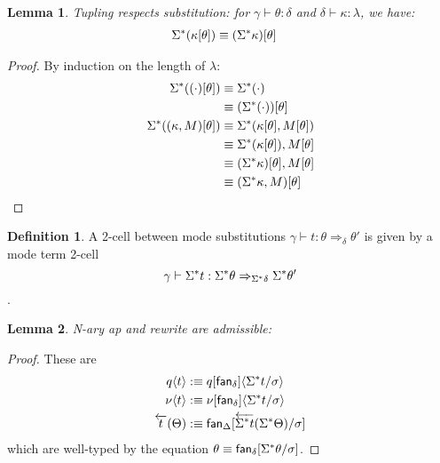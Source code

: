 \documentclass[10pt]{article}
\newtheorem{lemma}{Lemma}
\theoremstyle{definition}
\newtheorem{definition}{Definition}
\newcommand{\yields}{\vdash}
\newcommand{\tcell}{\Rightarrow}
\newcommand{\type}{\,\,\mathsf{mode}}
\newcommand\fan[1]{\ensuremath{\mathsf{fan}_{#1}}}
\newcommand{\rewrite}[2]{\overleftarrow{#1}(#2)}
\newcommand\TypeTwo[4]{\ensuremath{#1 \vdash #2 :  #3 \tcell #4}}
\newcommand\TermTwoT[5]{\ensuremath{#1 \vdash {#2} : #3 \tcell_{#5} #4}}
\newcommand\TrPlus[2]{\ensuremath{{#1}^+(#2)}}
\newcommand\ap[2]{\ensuremath{#1 \langle #2 \rangle }}
\begin{document}
\begin{lemma}
Tupling respects substitution: for $\gamma \yields \theta : \delta$ and $\delta \yields \kappa : \lambda$, we have:
\begin{align*}
\Sigma^*{(\kappa[\theta])} &\equiv (\Sigma^*{\kappa})[\theta]
\end{align*}
\end{lemma}
\begin{proof}
By induction on the length of $\lambda$:
\begin{align*}
\Sigma^*{((\cdot)[\theta])}
&\equiv \Sigma^*{(\cdot)} \\
&\equiv (\Sigma^*{(\cdot)})[\theta] \\
\Sigma^*{((\kappa, M)[\theta])}
&\equiv \Sigma^*{(\kappa[\theta], M[\theta])} \\
&\equiv \Sigma^*{(\kappa[\theta]), M[\theta]} \\
&\equiv (\Sigma^*{\kappa})[\theta], M[\theta] \\
&\equiv (\Sigma^*{\kappa}, M)[\theta]
\end{align*}
\end{proof}

\begin{definition}
A 2-cell between mode substitutions $\gamma \yields t : \theta \tcell_\delta \theta' $ is given by a mode term 2-cell \[\gamma \yields \ctxtuple t : \ctxtuple \theta \tcell_{\ctxtuple \delta} \ctxtuple \theta' \].
\end{definition}

\begin{lemma}\label{lem:n-ary-ap-rewrite}
N-ary ap and rewrite are admissible:
\end{lemma}
\begin{proof}
These are
\begin{align*}
\ap {q} {t} &:\equiv \ap{q[\fan{\delta}]}{\ctxtuple t/\sigma} \\
\ap {\nu} {t} &:\equiv \ap{\nu[\fan{\delta}]}{\ctxtuple t/\sigma} \\
\rewrite{t}{\Theta} &:\equiv \fan{\Delta}[\rewrite{\ctxtuple t}{\ctxtuple \Theta}/\sigma]
\end{align*}
which are well-typed by the equation $\theta \equiv \fan{\delta}[\ctxtuple \theta / \sigma]$.
\end{proof}
\end{document}

